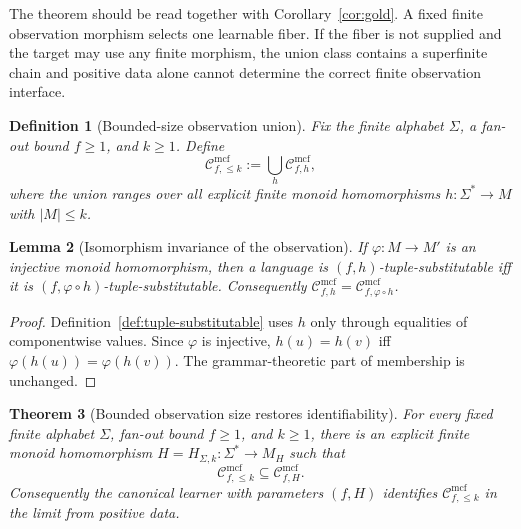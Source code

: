\documentclass[11pt,a4paper]{article}
\newtheorem{theorem}{Theorem}[section]
\newtheorem{lemma}[theorem]{Lemma}
\newtheorem{definition}[theorem]{Definition}
\theoremstyle{remark}
\newcommand{\Cmcf}[2]{\mathcal{C}^{\mathrm{mcf}}_{#1,#2}}
\begin{document}
The theorem should be read together with Corollary~\ref{cor:gold}.  A
fixed finite observation morphism selects one learnable fiber.  If the fiber is
not supplied and the target may use any finite morphism, the union class
contains a superfinite chain and positive data alone cannot determine the
correct finite observation interface.

\begin{definition}[Bounded-size observation union]
\label{def:bounded-observation-union}
Fix the finite alphabet \(\Sigma\), a fan-out bound \(f\ge1\), and \(k\ge1\).
Define
\[
  \Cmcf{f}{\le k}:=\bigcup_h \Cmcf{f}{h},
\]
where the union ranges over all explicit finite monoid homomorphisms
\(h:\Sigma^*\to M\) with \(|M|\le k\).
\end{definition}

\begin{lemma}[Isomorphism invariance of the observation]
\label{lem:iso-invariance}
If \(\varphi:M\to M'\) is an injective monoid homomorphism, then a language is
\((f,h)\)-tuple-substitutable iff it is \((f,\varphi\circ h)\)-tuple-substitutable.
Consequently \(\Cmcf{f}{h}=\Cmcf{f}{\varphi\circ h}\).
\end{lemma}

\begin{proof}
Definition~\ref{def:tuple-substitutable} uses \(h\) only through equalities of
componentwise values.  Since \(\varphi\) is injective,
\(h(u)=h(v)\) iff \(\varphi(h(u))=\varphi(h(v))\).  The grammar-theoretic part of
membership is unchanged.
\end{proof}

\begin{theorem}[Bounded observation size restores identifiability]
\label{thm:bounded-union-identifiable}
For every fixed finite alphabet \(\Sigma\), fan-out bound \(f\ge1\), and
\(k\ge1\), there is an explicit finite monoid homomorphism
\(H=H_{\Sigma,k}:\Sigma^*\to M_H\) such that
\[
  \Cmcf{f}{\le k}\subseteq\Cmcf{f}{H}.
\]
Consequently the canonical learner with parameters \((f,H)\) identifies
\(\Cmcf{f}{\le k}\) in the limit from positive data.
\end{theorem}
\end{document}
